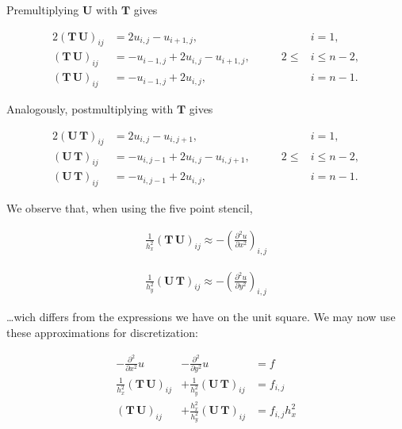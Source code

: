 Premultiplying $\mathbf{U}$ with $\mathbf{T}$ gives

\begin{alignat*}{2}
  (\mathbf{{T}} \, \mathbf{{U}})_{ij} &= 2u_{i,j} - u_{i+1,j}, &\qquad &i=1, \\
  (\mathbf{{T}} \, \mathbf{{U}})_{ij} &= -u_{i-1,j}+2u_{i,j} - u_{i+1,j}, &\qquad 2 \leq &i \leq n-2, \\
  (\mathbf{{T}} \, \mathbf{{U}})_{ij} &= -u_{i-1,j}+2u_{i,j}, &\qquad &i=n-1.
\end{alignat*}

Analogously, postmultiplying with $\mathbf{T}$ gives

\begin{alignat*}{2}
  (\mathbf{{U}} \, \mathbf{{T}})_{ij} &= 2u_{i,j} - u_{i,j+1}, &\qquad &i=1, \\
  (\mathbf{{U}} \, \mathbf{{T}})_{ij} &= -u_{i,j-1}+2u_{i,j} - u_{i,j+1}, &\qquad 2 \leq &i \leq n-2, \\
  (\mathbf{{U}} \, \mathbf{{T}})_{ij} &= -u_{i,j-1}+2u_{i,j}, &\qquad &i=n-1.
\end{alignat*}

We observe that, when using the five point stencil, 

\begin{align}
  \frac{1}{h_x^2} (\mathbf{{T}} \, \mathbf{{U}})_{ij} \approx -\left( \frac{\partial^2 u}{\partial x^2} \right)_{i,j}
\end{align}

\begin{align}
  \frac{1}{h_y^2} (\mathbf{{U}} \, \mathbf{{T}})_{ij} \approx -\left( \frac{\partial^2 u}{\partial y^2} \right)_{i,j}
\end{align}

\ldots wich differs from the expressions we have on the unit square. We may now use these approximations for discretization:

\begin{equation}
\begin{array}{ccl}
	-\frac{\partial^2 }{\partial x^2} u &-\frac{\partial^2}{\partial y^2} u &= f \\
  \frac{1}{h_x^2}(\mathbf{{T}} \, \mathbf{{U}})_{ij} &+\frac{1}{h_y^2} (\mathbf{{U}} \, \mathbf{{T}})_{ij} &= f_{i,j} \\
	(\mathbf{{T}} \, \mathbf{{U}})_{ij} &+\frac{h_x^2}{h_y^2} (\mathbf{{U}} \, \mathbf{{T}})_{ij} &= f_{i,j} h_x^2
\end{array}
\end{equation}

